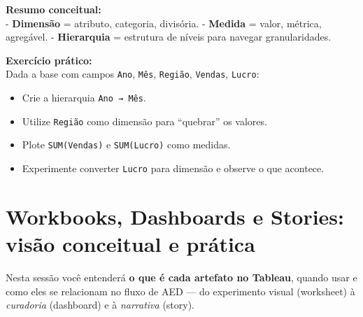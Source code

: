 \begin{NoteBox}
\textbf{Resumo conceitual:}\\
- \textbf{Dimensão} = atributo, categoria, divisória.  
- \textbf{Medida} = valor, métrica, agregável.  
- \textbf{Hierarquia} = estrutura de níveis para navegar granularidades.
\end{NoteBox}

\begin{SolvedBox}
\textbf{Exercício prático:}\\  
Dada a base com campos \texttt{Ano}, \texttt{Mês}, \texttt{Região}, \texttt{Vendas}, \texttt{Lucro}:  
\begin{itemize}
  \item Crie a hierarquia \texttt{Ano → Mês}.  
  \item Utilize \texttt{Região} como dimensão para “quebrar” os valores.  
  \item Plote \texttt{SUM(Vendas)} e \texttt{SUM(Lucro)} como medidas.  
  \item Experimente converter \texttt{Lucro} para dimensão e observe o que acontece.
\end{itemize}
\end{SolvedBox}


\section{Workbooks, Dashboards e Stories: visão conceitual e prática}

Nesta sessão você entenderá \textbf{o que é cada artefato no Tableau}, quando usar e como eles se relacionam no fluxo de AED — do experimento visual (worksheet) à \textit{curadoria} (dashboard) e à \textit{narrativa} (story).


